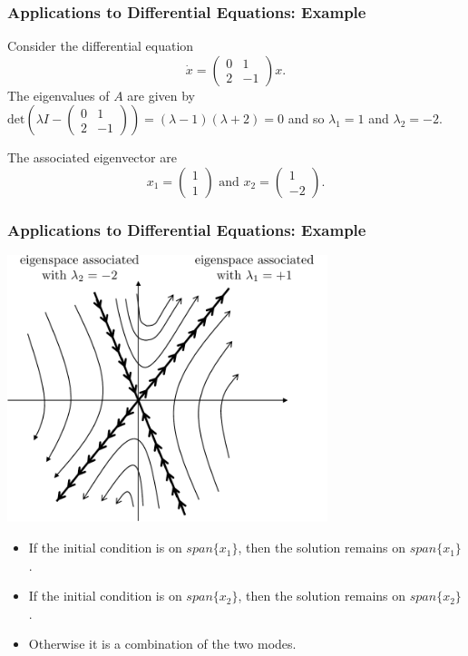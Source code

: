 \documentclass{beamer}
\begin{document}
\begin{frame}\frametitle{Applications to Differential Equations: Example}
	Consider the differential equation
	\[
		\dot{x} 
			= \begin{pmatrix}
	    		0 & 1\\
	    		2 & -1
	  		  \end{pmatrix} x.
	\]
	The eigenvalues of $A$ are given by
	\(
		\text{det}(\lambda I - \begin{pmatrix}
	    							0 & 1\\
	    							2 & -1
	  							\end{pmatrix}) 
	  	= (\lambda - 1)(\lambda + 2) = 0
	\)
	and so $\lambda_1 = 1$ and $\lambda_2 = -2$.
	
	\vfill
	
	The associated eigenvector are
	\[ 
		x_1 = \begin{pmatrix} 1 \\ 1 \end{pmatrix} 
		\text{ and }
		x_2 =  \begin{pmatrix} 1 \\ -2 \end{pmatrix}.
	\]
\end{frame}

\begin{frame}\frametitle{Applications to Differential Equations: Example}
	\begin{center}
		\includegraphics[width=0.7\textwidth]{figures/chap6_invariant_subspaces}
	\end{center}
	
	\begin{itemize}
		\item 	If the initial condition is on $span\{x_1\}$, then the solution remains on $span\{x_1\}$.
		\item If the initial condition is on $span\{x_2\}$, then the solution remains on $span\{x_2\}$.
		\item Otherwise it is a combination of the two modes.
	\end{itemize}
\end{frame}
\end{document}
